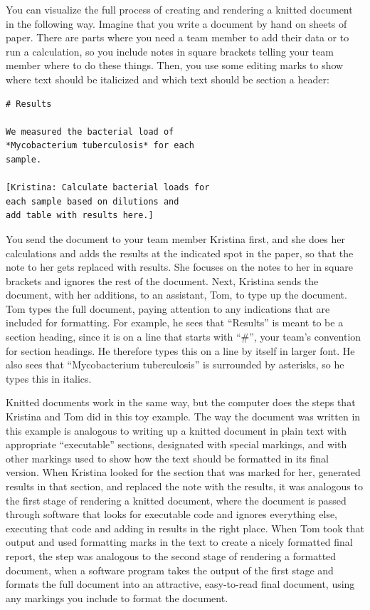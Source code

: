 \documentclass[]{tufte-book}
\begin{document}
You can visualize the full process of creating and rendering a knitted document
in the following way. Imagine that you write a document by hand on sheets of
paper. There are parts where you need a team member to add their data or to run
a calculation, so you include notes in square brackets telling your team member
where to do these things. Then, you use some editing marks to show where
text should be italicized and which text should be section a header:

\begin{verbatim}
# Results

We measured the bacterial load of 
*Mycobacterium tuberculosis* for each 
sample. 

[Kristina: Calculate bacterial loads for 
each sample based on dilutions and
add table with results here.]
\end{verbatim}

You send the document to your team member Kristina first, and she does her
calculations and adds the results at the indicated spot in the paper, so that
the note to her gets replaced with results. She focuses on the notes to her in
square brackets and ignores the rest of the document. Next, Kristina sends the
document, with her additions, to an assistant, Tom, to type up the document. Tom
types the full document, paying attention to any indications that are included
for formatting. For example, he sees that ``Results'' is meant to be a section
heading, since it is on a line that starts with ``\#'', your team's convention for
section headings. He therefore types this on a line by itself in larger font. He
also sees that ``Mycobacterium tuberculosis'' is surrounded by asterisks, so he
types this in italics.

Knitted documents work in the same way, but the computer does the steps that
Kristina and Tom did in this toy example. The way the document was written in
this example is analogous to writing up a knitted document in plain text with
appropriate ``executable'' sections, designated with special markings, and with
other markings used to show how the text should be formatted in its final
version. When Kristina looked for the section that was marked for her, generated
results in that section, and replaced the note with the results, it was
analogous to the first stage of rendering a knitted document, where the document
is passed through software that looks for executable code and ignores everything
else, executing that code and adding in results in the right place.
When Tom took that output and used formatting marks in the text to create a
nicely formatted final report, the step was analogous to the second stage of
rendering a formatted document, when a software program takes the output of the
first stage and formats the full document into an attractive, easy-to-read final
document, using any markings you include to format the document.
\end{document}
